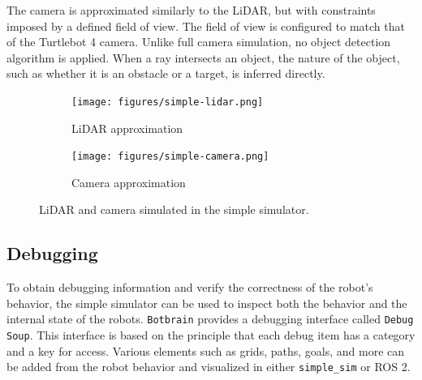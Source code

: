 The camera is approximated similarly to the LiDAR, but with constraints imposed by a defined field of view. The field of view is configured to match that of the Turtlebot 4 camera. Unlike full camera simulation, no object detection algorithm is applied. When a ray intersects an object, the nature of the object, such as whether it is an obstacle or a target, is inferred directly.

\begin{figure}
    \centering

    \begin{subfigure}[b]{0.45\textwidth}
        \centering
        \texttt{[image: figures/simple-lidar.png]}
        \caption{LiDAR approximation}
        \label{fig:lidar-approximation}
    \end{subfigure}
    \begin{subfigure}[b]{0.45\textwidth}
        \centering
        \texttt{[image: figures/simple-camera.png]}
        \caption{Camera approximation}
        \label{fig:camera-approximation}
    \end{subfigure}

    \caption{LiDAR and camera simulated in the simple simulator.}\label{fig:sensor-approximation}
\end{figure}

\subsection{Debugging}
To obtain debugging information and verify the correctness of the robot's behavior, the simple simulator can be used to inspect both the behavior and the internal state of the robots. \texttt{Botbrain} provides a debugging interface called \texttt{Debug Soup}. This interface is based on the principle that each debug item has a category and a key for access. Various elements such as grids, paths, goals, and more can be added from the robot behavior and visualized in either \texttt{simple\_sim} or ROS 2.

